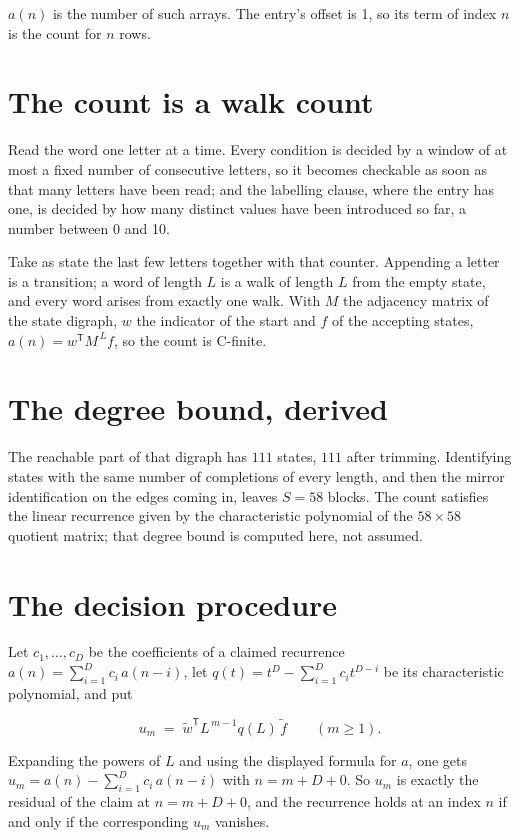 \documentclass[11pt]{article}
\theoremstyle{definition}
\begin{document}
$a(n)$ is the number of such arrays. The entry's offset is 1, so its term of index $n$ is the count for $n$ rows.

\section{The count is a walk count}

Read the word one letter at a time. Every condition is decided by a window of at most a fixed number of consecutive letters, so it becomes checkable as soon as that many letters have been read; and the labelling clause, where the entry has one, is decided by how many distinct values have been introduced so far, a number between $0$ and 10.

Take as state the last few letters together with that counter. Appending a letter is a transition; a word of length $L$ is a walk of length $L$ from the empty state, and every word arises from exactly one walk. With $M$ the adjacency matrix of the state digraph, $w$ the indicator of the start and $f$ of the accepting states, $a(n) = w^{\mathsf T}M^{\,L}f$, so the count is C-finite.

\section{The degree bound, derived}

The reachable part of that digraph has $111$ states, $111$ after trimming. Identifying states with the same number of completions of every length, and then the mirror identification on the edges coming in, leaves $S = 58$ blocks. The count satisfies the linear recurrence given by the characteristic polynomial of the $58\times58$ quotient matrix; that degree bound is computed here, not assumed.

\section{The decision procedure}

Let $c_1,\dots,c_D$ be the coefficients of a claimed recurrence $a(n) = \sum_{i=1}^{D} c_i\,a(n-i)$, let $q(t) = t^{D} - \sum_{i=1}^{D} c_i t^{D-i}$ be its characteristic polynomial, and put

\[u_m \;=\; \tilde w^{\mathsf T} L^{\,m-1} q(L)\,\tilde f \qquad (m \ge 1).\]

Expanding the powers of $L$ and using the displayed formula for $a$, one gets $u_m = a(n) - \sum_{i=1}^{D} c_i\,a(n-i)$ with $n = m + D + 0$. So $u_m$ is exactly the residual of the claim at $n = m + D + 0$, and the recurrence holds at an index $n$ if and only if the corresponding $u_m$ vanishes.
\end{document}
